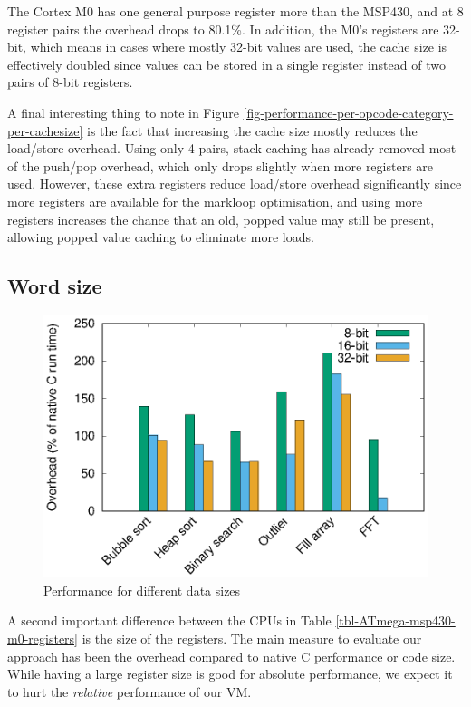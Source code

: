 The Cortex M0 has one general purpose register more than the MSP430, and at 8 register pairs the overhead drops to 80.1\%. In addition, the M0's registers are 32-bit, which means in cases where mostly 32-bit values are used, the cache size is effectively doubled since values can be stored in a single register instead of two pairs of 8-bit registers.

A final interesting thing to note in Figure \ref{fig-performance-per-opcode-category-per-cachesize} is the fact that increasing the cache size mostly reduces the load/store overhead. Using only 4 pairs, stack caching has already removed most of the push/pop overhead, which only drops slightly when more registers are used. However, these extra registers reduce load/store overhead significantly since more registers are available for the markloop optimisation, and using more registers increases the chance that an old, popped value may still be present, allowing popped value caching to eliminate more loads.

\subsection{Word size}
\label{sec-evaluation-other-platforms-word-size}

\begin{figure}
\centering
\includegraphics[width=\mygraphsize]{8_16_32_bit.eps}
\caption{Performance for different data sizes}
\label{fig-performance-8-16-32-bit}
\end{figure}



A second important difference between the CPUs in Table \ref{tbl-ATmega-msp430-m0-registers} is the size of the registers. The main measure to evaluate our approach has been the overhead compared to native C performance or code size. While having a large register size is good for absolute performance, we expect it to hurt the \emph{relative} performance of our VM.

